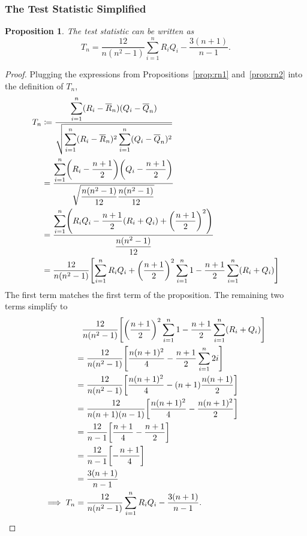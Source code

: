 \documentclass[letterpaper, reqno]{amsart}
\newtheorem{prop}{Proposition}[section]
\numberwithin{equation}{section}
\newcommand{\ddfrac}[2]{\frac{\displaystyle #1}{\displaystyle #2}}
\newcommand{\sumi}[2]{\sum_{#1=1}^{#2}}
\newcommand{\Rnbar}{\overline{R}_n}
\newcommand{\Qnbar}{\overline{Q}_n}
\begin{document}
\subsubsection{The Test Statistic Simplified}
\begin{prop}
  The test statistic can be written as
  \[ T_n = \frac{12}{n(n^2 - 1)} \sumi{i}{n}R_iQ_i - \frac{3(n+1)}{n-1}. \]
\end{prop}

\begin{proof}
  Plugging the expressions from Propositions~\ref{prop:rn1} and~\ref{prop:rn2}
  into the definition of $T_n$,
  \begin{align*}
    T_n &\coloneqq \ddfrac{\sumi{i}{n}(R_i - \Rnbar)(Q_i - \Qnbar)}
                              {\sqrt{\sumi{i}{n} (R_i - \Rnbar)^2 \sumi{i}{n} (Q_i - \Qnbar)^2}} \\
    &= \ddfrac{\sumi{i}{n}\mleft(R_i - \frac{n+1}{2}\mright)\mleft(Q_i - \frac{n+1}{2}\mright)}
                              {\sqrt{\frac{n(n^2 - 1)}{12} \frac{n(n^2 - 1)}{12}}} \\
    &= \ddfrac{\sumi{i}{n}\mleft(R_iQ_i
                                - \frac{n+1}{2}(R_i + Q_i)
                                + \mleft(\frac{n+1}{2}\mright)^2 \mright)}
                              {\frac{n(n^2 - 1)}{12}} \\
    &= \frac{12}{n(n^2 - 1)} \mleft[ \sumi{i}{n}R_iQ_i
    + \mleft(\frac{n+1}{2}\mright)^2  \sumi{i}{n} 1
    - \frac{n+1}{2}\sumi{i}{n}(R_i + Q_i) \mright]
  \end{align*}
  The first term matches the first term of the proposition. The remaining two
  terms simplify to
  \begin{align*}
    &\phantom{=} \frac{12}{n(n^2 - 1)} \mleft[ \mleft(\frac{n+1}{2}\mright)^2  \sumi{i}{n} 1
    - \frac{n+1}{2}\sumi{i}{n}(R_i + Q_i) \mright]  \\
    &= \frac{12}{n(n^2 - 1)} \mleft[ \frac{n(n+1)^2}{4} - \frac{n+1}{2}\sumi{i}{n}2i \mright] \\
    &= \frac{12}{n(n^2 - 1)} \mleft[ \frac{n(n+1)^2}{4} - (n+1)\frac{n(n+1)}{2} \mright] \\
    &= \frac{12}{n(n+1)(n-1)} \mleft[ \frac{n(n+1)^2}{4} - \frac{n(n+1)^2}{2} \mright] \\
    &= \frac{12}{n-1} \mleft[ \frac{n+1}{4} - \frac{n+1}{2} \mright] \\
    &= \frac{12}{n-1} \mleft[ -\frac{n+1}{4} \mright] \\
    &= \frac{3(n+1)}{n-1} \\
    \implies T_n &= \frac{12}{n(n^2 - 1)} \sumi{i}{n}R_iQ_i - \frac{3(n+1)}{n-1}. \qedhere
  \end{align*}
\end{proof}
\end{document}
